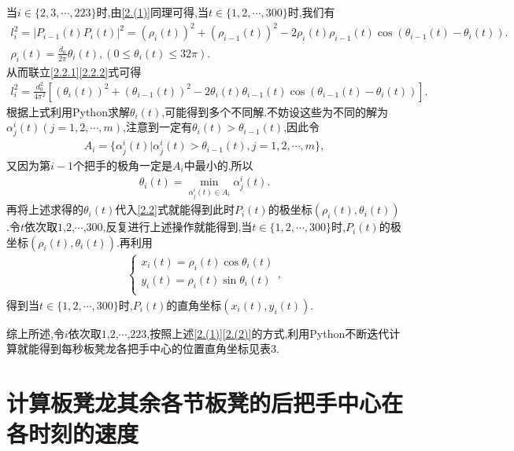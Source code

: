 \documentclass[lang=cn,newtx,10pt,scheme=chinese]{../Template/elegantbook}
\begin{document}
当\(i\in \{ 2,3,\cdots ,223 \}\)时,由\eqref{2.(1)}同理可得,当\(t\in \{ 1,2,\cdots ,300 \}\)时,我们有
\begin{gather}
l_{i}^{2}=| P_{i-1}(t)P_{i}(t)|^2=(\rho _{i}(t))^2+(\rho _{i-1}(t))^2 - 2\rho _{i}(t)\rho _{i-1}(t)\cos (\theta _{i-1}(t)-\theta _{i}(t)) .\label{2.2.1}
\\
\rho _{i}(t)=\frac{d_0}{2\pi}\theta _{i}(t),(0\leqslant \theta _{i}(t)\leqslant 32\pi) .\label{2.2.2}
\end{gather}
从而联立\eqref{2.2.1}\eqref{2.2.2}式可得
\begin{align}
l_{i}^{2}=\frac{d_{0}^{2}}{4\pi ^2}[(\theta _{i}(t))^2+(\theta _{i-1}(t))^2 - 2\theta _{i}(t)\theta _{i-1}(t)\cos (\theta _{i-1}(t)-\theta _{i}(t))] .\label{2.0.0}
\end{align}
根据上式利用Python求解\(\theta _{i}(t)\),可能得到多个不同解.不妨设这些为不同的解为\(\alpha _{j}^{i}(t) (j = 1,2,\cdots ,m)\),注意到一定有\(\theta _{i}(t)>\theta _{i-1}(t)\),因此令
\begin{align}
A_i = \{ \alpha _{j}^{i}(t) |\alpha _{j}^{i}(t) >\theta _{i-1}(t),j = 1,2,\cdots ,m \},
\end{align}
又因为第\(i - 1\)个把手的极角一定是$A_i$中最小的,所以
\begin{align}
\theta _i(t)=\underset{\alpha _{j}^{i}(t)\in A_i}{\min}\alpha _{j}^{i}(t).   
\end{align}
再将上述求得的\(\theta _i(t)\)代入\eqref{2.2}式就能得到此时\(P_{i}(t)\)的极坐标\((\rho _{i}(t),\theta _{i}(t))\).令\(t\)依次取\(1\),\(2\),\(\cdots\),\(300\),反复进行上述操作就能得到,当\(t\in \{ 1,2,\cdots ,300 \}\)时,\(P_{i}(t)\)的极坐标\((\rho _{i}(t),\theta _{i}(t))\).再利用
\begin{align}
\begin{cases}
x_{i}(t)=\rho _{i}(t)\cos \theta _{i}(t)\\
y_{i}(t)=\rho _{i}(t)\sin \theta _{i}(t)\\
\end{cases}, 
\end{align}
得到当\(t\in \{ 1,2,\cdots ,300 \}\)时,\(P_{i}(t)\)的直角坐标\((x_{i}(t),y_{i}(t))\).

综上所述,令\(i\)依次取\(1\),\(2\),\(\cdots\),\(223\),按照上述\eqref{2.(1)}\eqref{2.(2)}的方式,利用Python不断迭代计算就能得到每秒板凳龙各把手中心的位置直角坐标见表3.

\section{计算板凳龙其余各节板凳的后把手中心在各时刻的速度}
\end{document}
